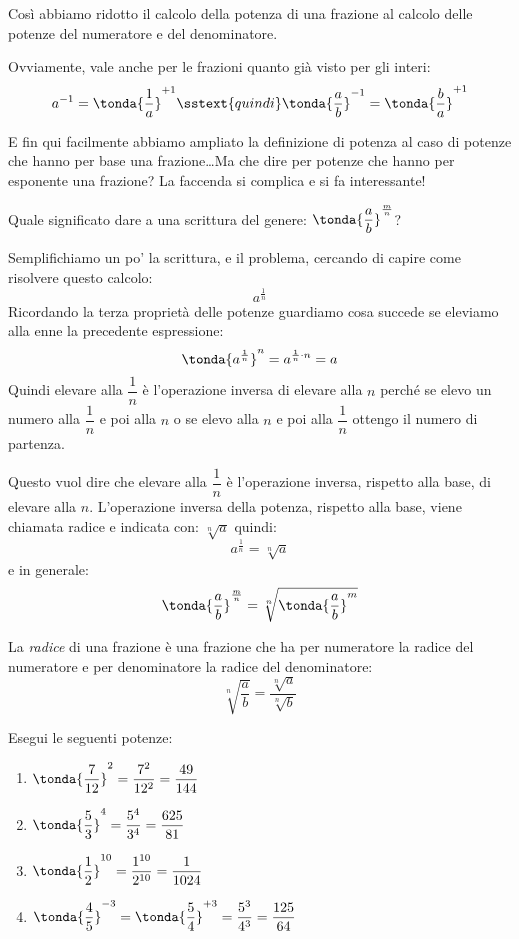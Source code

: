 Così abbiamo ridotto il calcolo della potenza di una frazione al calcolo 
delle potenze del numeratore e del denominatore.

\begin{osservazione}{}{}
Ovviamente, vale anche per le frazioni quanto già visto per gli interi: 
\[a^{-1} = \tonda{\dfrac{1}{a}}^{+1} \sstext{quindi} 
  \tonda{\dfrac{a}{b}}^{-1} = \tonda{\dfrac{b}{a}}^{+1}\]
\end{osservazione}

E fin qui facilmente abbiamo ampliato la definizione di potenza al caso di 
potenze che hanno per base una frazione\dots Ma che dire per potenze che 
hanno per esponente una frazione? La faccenda si complica e si fa interessante!

Quale significato dare a una scrittura del genere: 
\(\tonda{\dfrac{a}{b}}^{\frac{m}{n}}\)?

Semplifichiamo un po' la scrittura, e il problema, cercando di capire come 
risolvere questo calcolo:
\[a^{\frac{1}{n}}\]
Ricordando la terza proprietà delle potenze guardiamo cosa succede se 
eleviamo alla enne la precedente espressione:
\[\tonda{a^{\frac{1}{n}}}^n = a^{\frac{1}{n} \cdot n} = a\]
Quindi elevare alla \(\dfrac{1}{n}\) è l'operazione inversa di elevare alla 
\(n\) perché se elevo un numero alla \(\dfrac{1}{n}\) e poi alla \(n\) o se 
elevo alla \(n\) e poi alla \(\dfrac{1}{n}\) ottengo il numero di partenza.

Questo vuol dire che elevare alla \(\dfrac{1}{n}\) è l'operazione inversa, 
rispetto alla base, di elevare alla \(n\). 
L'operazione inversa della potenza, rispetto alla base, viene 
chiamata 
radice e indicata con: \(\sqrt[n]{a}\) quindi:
\[a^{\frac{1}{n}} = \sqrt[n]{a}\]
e in generale:
\[\tonda{\frac{a}{b}}^{\frac{m}{n}} = \sqrt[n]{\tonda{\frac{a}{b}}^m}\]

\begin{definizione}{}{}
La \emph{radice} di una frazione è una frazione che ha per numeratore la 
radice del numeratore e per denominatore la radice del denominatore:
\[\sqrt[n]{\dfrac{a}{b}} = \dfrac{\sqrt[n]{a}}{\sqrt[n]{b}}\]
\end{definizione}

\begin{esempio}{}{}
Esegui le seguenti potenze:
\begin{htmulticols}{2}
\begin{enumerate} %
\item \(\tonda{\dfrac{7}{12}}^2 = \dfrac{7^2}{12^2} = \dfrac{49}{144}\)
\item \(\tonda{\dfrac{5}{3}}^4 = \dfrac{5^4}{3^4} = \dfrac{625}{81}\)
\item \(\tonda{\dfrac{1}{2}}^{10} = \dfrac{1^{10}}{2^{10}} = 
        \dfrac{1}{1024}\)
\item \(\tonda{\dfrac{4}{5}}^{-3} = \tonda{\dfrac{5}{4}}^{+3} = 
        \dfrac{5^3}{4^3} = \dfrac{125}{64}\)
\end{enumerate}
\end{htmulticols}
\end{esempio}

